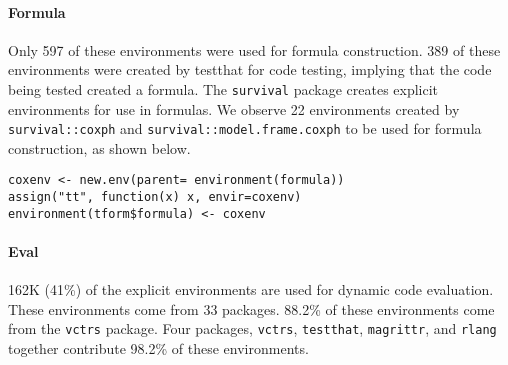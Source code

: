 \documentclass[10pt,review,sigplan,anonymous=true,authorversion=true,nonacm=true]{acmart}
\newcommand{\code}[1]{\lstinline |#1|\xspace}
\begin{document}
\paragraph{Formula}
Only 597 of these environments were used for formula construction. 389 of these
environments were created by testthat for code testing, implying that the code
being tested created a formula. The \code{survival} package creates explicit
environments for use in formulas. We observe 22 environments created by
\code{survival::coxph} and \code{survival::model.frame.coxph} to be used for
formula construction, as shown below.

\begin{lstlisting}
coxenv <- new.env(parent= environment(formula))
assign("tt", function(x) x, envir=coxenv)
environment(tform$formula) <- coxenv
\end{lstlisting}



\paragraph{Eval}
162K (41\%) of the explicit environments are used for dynamic code evaluation.
These environments come from 33 packages. 88.2\% of these environments come from
the \code{vctrs} package. Four packages, \code{vctrs}, \code{testthat},
\code{magrittr}, and \code{rlang} together contribute 98.2\% of these
environments.
\end{document}
